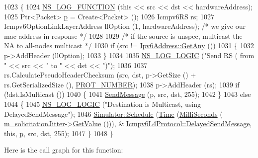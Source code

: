 \begin{DoxyCode}
1023 \{
1024   \hyperlink{log-macros-disabled_8h_a90b90d5bad1f39cb1b64923ea94c0761}{NS\_LOG\_FUNCTION} (\textcolor{keyword}{this} << src << dst << hardwareAddress);
1025   Ptr<Packet> \hyperlink{lte__link__budget_8m_ac9de518908a968428863f829398a4e62}{p} = Create<Packet> ();
1026   Icmpv6RS rs;
1027   Icmpv6OptionLinkLayerAddress llOption (1, hardwareAddress);  \textcolor{comment}{/* we give our mac address in response */}
1028 
1029   \textcolor{comment}{/* if the source is unspec, multicast the NA to all-nodes multicast */}
1030   \textcolor{keywordflow}{if} (src != \hyperlink{classns3_1_1Ipv6Address_a2783e8badfc98c8b0a8508bba6e1b91e}{Ipv6Address::GetAny} ())
1031     \{
1032       p->AddHeader (llOption);
1033     \}
1034 
1035   \hyperlink{group__logging_ga88acd260151caf2db9c0fc84997f45ce}{NS\_LOG\_LOGIC} (\textcolor{stringliteral}{"Send RS ( from "} << src << \textcolor{stringliteral}{" to "} << dst << \textcolor{stringliteral}{")"});
1036 
1037   rs.CalculatePseudoHeaderChecksum (src, dst, p->GetSize () + rs.GetSerializedSize (), 
      \hyperlink{classns3_1_1Icmpv6L4Protocol_aa56c41a886a45b8b4f22a19afc827e2d}{PROT\_NUMBER});
1038   p->AddHeader (rs);
1039   \textcolor{keywordflow}{if} (!dst.IsMulticast ())
1040     \{
1041       \hyperlink{classns3_1_1Icmpv6L4Protocol_aca22b3999b518531f807d822060a06a8}{SendMessage} (p, src, dst, 255);
1042     \}
1043   \textcolor{keywordflow}{else}
1044     \{
1045       \hyperlink{group__logging_ga88acd260151caf2db9c0fc84997f45ce}{NS\_LOG\_LOGIC} (\textcolor{stringliteral}{"Destination is Multicast, using DelayedSendMessage"});
1046       \hyperlink{classns3_1_1Simulator_a671882c894a08af4a5e91181bf1eec13}{Simulator::Schedule} (\hyperlink{namespacens3_1_1TracedValueCallback_a7ffd3e7c142ffe7c8a1d2db9b8de38ec}{Time} (\hyperlink{group__timecivil_gaf26127cf4571146b83a92ee18679c7a9}{MilliSeconds} (
      \hyperlink{classns3_1_1Icmpv6L4Protocol_ac7e4a25978a861e34cef7bdd27efb1d9}{m\_solicitationJitter}->\hyperlink{classns3_1_1RandomVariableStream_a4fa5944dc4cb11544e661ed23072b36c}{GetValue} ())), &
      \hyperlink{classns3_1_1Icmpv6L4Protocol_a3c4b85301ce19b8b2791402972553127}{Icmpv6L4Protocol::DelayedSendMessage}, \textcolor{keyword}{this}, 
      \hyperlink{lte__link__budget_8m_ac9de518908a968428863f829398a4e62}{p}, src, dst, 255);
1047     \}
1048 \}
\end{DoxyCode}


Here is the call graph for this function\+:




